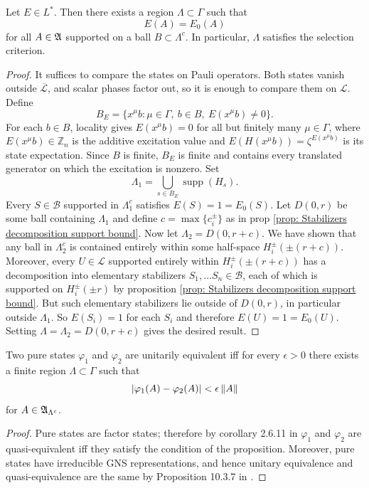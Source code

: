 \documentclass[11pt]{amsart}
\begin{document}
\begin{prop}\label{prop: excitation states satisfy strong selection criterion}
   Let $E\in L^*$. Then there exists a region $\Lambda\subset\Gamma$ such that 
   \[
    E(A)=E_0(A)
   \]
   for all $A\in\mathfrak{A}$ supported on a ball $B\subset\Lambda^c$. In particular, $\Lambda$ satisfies the selection criterion.
   \begin{proof}
       It suffices to compare the states on Pauli operators. Both states vanish outside $\overline{\mathcal L}$, and scalar phases factor out, so it is enough to compare them on $\mathcal L$. Define
       \[
           B_E=\{x^\mu b:\mu\in\Gamma,\ b\in B,\ E(x^\mu b)\neq0\}.
       \]
       For each $b\in B$, locality gives $E(x^\mu b)=0$ for all but finitely many $\mu\in\Gamma$, where $E(x^\mu b)\in\mathbb Z_n$ is the additive excitation value and $E(H(x^\mu b))=\zeta^{E(x^\mu b)}$ is its state expectation. Since $B$ is finite, $B_E$ is finite and contains every translated generator on which the excitation is nonzero. Set
       \[
           \Lambda_1=\bigcup_{s\in B_E}\operatorname{supp}(H_s).
       \]
       Every $S\in\mathcal B$ supported in $\Lambda_1^c$ satisfies $E(S)=1=E_0(S)$. Let $D(0,r)$ be some ball containing $\Lambda_1$ and define $c=\max\{c_i^\pm\}$ as in prop \ref{prop: Stabilizers decomposition support bound}. Now let $\Lambda_2= D(0,r+c)$. We have shown that any ball in $\Lambda_2^c$ is contained entirely within some half-space $H_i^\pm(\pm (r+c))$. Moreover,  every $U\in\mathcal L$ supported entirely within $H_i^\pm(\pm (r+c))$ has a decomposition into elementary stabilizers $S_1,\ldots S_n\in\mathcal B$, each of which is supported on $H_i^\pm(\pm r)$ by proposition \ref{prop: Stabilizers decomposition support bound}. But such elementary stabilizers lie outside of $D(0,r)$, in particular outside $\Lambda_1$. So $E(S_i)=1$ for each $S_i$ and therefore $E(U)=1=E_0(U)$. Setting $\Lambda=\Lambda_2=D(0,r+c)$ gives the desired result.
   \end{proof}
\end{prop}
\begin{prop}\label{prop: states are equivalent if they agree at infinity}
    Two pure states $\varphi_1$ and $\varphi_2$ are unitarily equivalent iff for every $\epsilon >0$ there exists a finite region $\Lambda\subset\Gamma$ such that
    \[
        |\varphi_1(A)-\varphi_2(A)|<\epsilon\left\lVert A\right\rVert
    \]
    for $A\in\mathfrak{A}_{\Lambda^c}$. 
    \begin{proof}
        Pure states are factor states; therefore by corollary 2.6.11 in \cite{bratteli_1987} $\varphi_1$ and $\varphi_2$ are quasi-equivalent iff they satisfy the condition of the proposition. Moreover, pure states have irreducible GNS representations, and hence unitary equivalence and quasi-equivalence are the same by Proposition 10.3.7 in \cite{kadison_1997}.
    \end{proof}
\end{prop}
\end{document}
